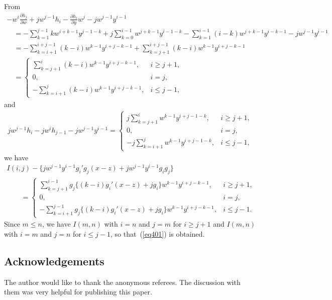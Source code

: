 \documentclass[pdftex]{sigma}
\numberwithin{equation}{section}
\theoremstyle{definition}
\begin{document}
From
\begin{gather*}
-w^i\frac{\partial h_j}{\partial w}+jw^{j-1}h_i -\frac{\partial h_i}{\partial y}w^j-jw^{j-1}y^{i-1}\\
\quad{}=-\sum_{k=1}^{j-1}kw^{i+k-1}y^{j-1-k}+j\sum_{k=0}^{i-1}w^{j+k-1}y^{i-1-k}-\sum_{k=1}^{i-1}(i-k)w^{j+k-1}y^{i-k-1}-jw^{j-1}y^{i-1}\\
\quad{} =-\sum_{k=i+1}^{i+j-1}(k-i)w^{k-1}y^{i+j-k-1}+\sum_{k=j+1}^{i+j-1}(k-i)w^{k-1}y^{i+j-k-1}\\
\quad{}=\begin{cases}
\sum\limits_{k=j+1}^{i}(k-i)w^{k-1}y^{i+j-k-1}, &i\geq j+1,\\
0, &i=j,\\
-\sum\limits_{k=i+1}^{j}(k-i)w^{k-1}y^{i+j-k-1},& i\leq j-1,
\end{cases}
\end{gather*}
and
\begin{gather*}
jw^{j-1}h_i-jw^ih_{j-1}-jw^{j-1}y^{i-1}
=
\begin{cases}
j\sum\limits_{k=j+1}^{i}w^{k-1}y^{i+j-1-k}, &i\geq j+1,\\
0, &i=j, \\
-j\sum\limits_{k=i+1}^{j}w^{k-1}y^{i+j-1-k}, &i\leq j-1,
\end{cases}
\end{gather*}
we have
\begin{gather*}
 I(i,j)- \big\{jw^{j-1}y^{i-1}g_i'g_j(x-z)+jw^{j-1}y^{i-1}g_ig_j\big\}\\
\qquad{} = \begin{cases}
\sum\limits_{k=j+1}^{i-1}g_j\{(k-i)g_i'(x-z)+jg_i\}w^{k-1}y^{i+j-k-1}, &i\geq j+1,\\
0, &i=j,\\
-\sum\limits_{k=i+1}^{j-1}g_j\{(k-i)g_i'(x-z)+jg_i\}w^{k-1}y^{i+j-k-1}, &i\leq j-1.
\end{cases}%
\end{gather*}
Since $m\leq n$, we have $I(m,n)$ with $i=n$ and $j=m$ for $i\geq j+1$ and $I(m,n)$ with $i=m$ and $j=n$ for $i\leq j-1$, so that~(\ref{eq401}) %
is obtained.

\subsection*{Acknowledgements}
The author would like to thank the anonymous referees. The discussion with them was very helpful for publishing this paper.
\end{document}
